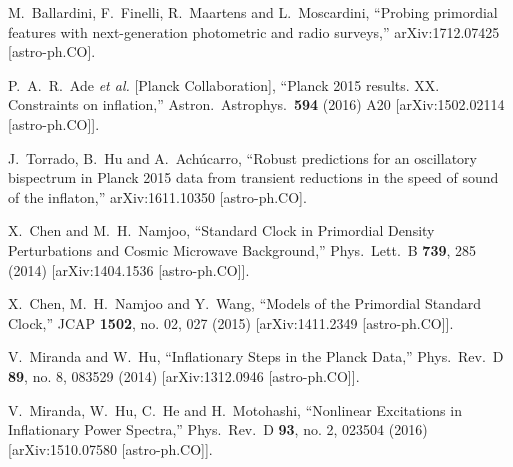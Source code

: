 \documentclass[12pt]{article}
\begin{document}
\begin{thebibliography}{99}
  M.~Ballardini, F.~Finelli, R.~Maartens and L.~Moscardini,
  ``Probing primordial features with next-generation photometric and radio surveys,''
  arXiv:1712.07425 [astro-ph.CO].


  P.~A.~R.~Ade {\it et al.} [Planck Collaboration],
  ``Planck 2015 results. XX. Constraints on inflation,''
  Astron.\ Astrophys.\  {\bf 594} (2016) A20
  [arXiv:1502.02114 [astro-ph.CO]].

  
  
  J.~Torrado, B.~Hu and A.~Ach\'ucarro,
  ``Robust predictions for an oscillatory bispectrum in Planck 2015 data from transient reductions in the speed of sound of the inflaton,''
  arXiv:1611.10350 [astro-ph.CO].
  
  X.~Chen and M.~H.~Namjoo,
  ``Standard Clock in Primordial Density Perturbations and Cosmic Microwave Background,''
  Phys.\ Lett.\ B {\bf 739}, 285 (2014)
  [arXiv:1404.1536 [astro-ph.CO]].
  
  X.~Chen, M.~H.~Namjoo and Y.~Wang,
  ``Models of the Primordial Standard Clock,''
  JCAP {\bf 1502}, no. 02, 027 (2015)
  [arXiv:1411.2349 [astro-ph.CO]].
 
 
  V.~Miranda and W.~Hu,
  ``Inflationary Steps in the Planck Data,''
  Phys.\ Rev.\ D {\bf 89}, no. 8, 083529 (2014)
  [arXiv:1312.0946 [astro-ph.CO]].
  
  
  V.~Miranda, W.~Hu, C.~He and H.~Motohashi,
  ``Nonlinear Excitations in Inflationary Power Spectra,''
  Phys.\ Rev.\ D {\bf 93}, no. 2, 023504 (2016)
  [arXiv:1510.07580 [astro-ph.CO]].
  

\end{thebibliography}
\end{document}
